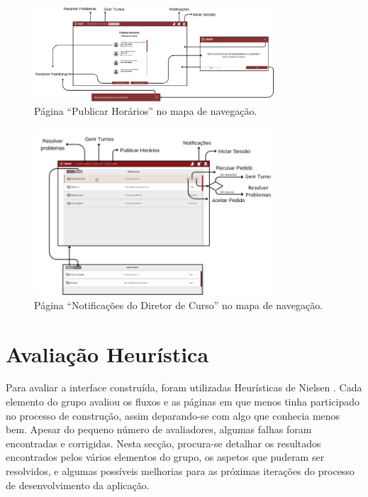 \documentclass[12pt, a4paper]{article}
\begin{document}
\begin{figure}[H]
    \centering
    \includegraphics[width=0.8\textwidth]{res/navigation/8.png}
    \caption{Página ``Publicar Horários'' no mapa de navegação.}
    \label{navigation-8}
\end{figure}

\begin{figure}[H]
    \centering
    \includegraphics[width=0.8\textwidth]{res/navigation/9.png}
    \caption{Página ``Notificações do Diretor de Curso'' no mapa de navegação.}
    \label{navigation-9}
\end{figure}

\section{Avaliação Heurística}

Para avaliar a interface construída, foram utilizadas Heurísticas de Nielsen \cite{nielsen}. Cada
elemento do grupo avaliou os fluxos e as páginas em que menos tinha participado no processo de
construção, assim deparando-se com algo que conhecia menos bem. Apesar do pequeno número de
avaliadores, algumas falhas foram encontradas e corrigidas. Nesta secção, procura-se detalhar os
resultados encontrados pelos vários elementos do grupo, os aspetos que puderam ser resolvidos, e
algumas possíveis melhorias para as próximas iterações do processo de desenvolvimento da aplicação.
\end{document}
